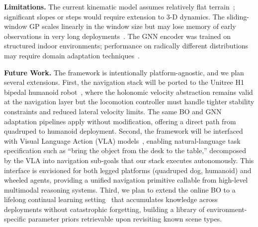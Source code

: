 \documentclass[conference]{IEEEtran}
\begin{document}
\textbf{Limitations.} The current kinematic model assumes relatively flat terrain~\cite{@TODO}; significant slopes or steps would require extension to 3-D dynamics. The sliding-window GP scales linearly in the window size but may lose memory of early observations in very long deployments~\cite{@TODO}. The GNN encoder was trained on structured indoor environments; performance on radically different distributions may require domain adaptation techniques~\cite{@TODO}.

\textbf{Future Work.} The framework is intentionally platform-agnostic, and we plan several extensions. First, the navigation stack will be ported to the Unitree H1 bipedal humanoid robot~\cite{@TODO}, where the holonomic velocity abstraction remains valid at the navigation layer but the locomotion controller must handle tighter stability constraints and reduced lateral velocity limits. The same BO and GNN adaptation pipelines apply without modification, offering a direct path from quadruped to humanoid deployment. Second, the framework will be interfaced with Visual Language Action (VLA) models~\cite{@TODO}, enabling natural-language task specification such as ``bring the object from the desk to the table,'' decomposed by the VLA into navigation sub-goals that our stack executes autonomously. This interface is envisioned for both legged platforms (quadruped dog, humanoid) and wheeled agents, providing a unified navigation primitive callable from high-level multimodal reasoning systems. Third, we plan to extend the online BO to a lifelong continual learning setting~\cite{@TODO} that accumulates knowledge across deployments without catastrophic forgetting, building a library of environment-specific parameter priors retrievable upon revisiting known scene types.



\end{document}
